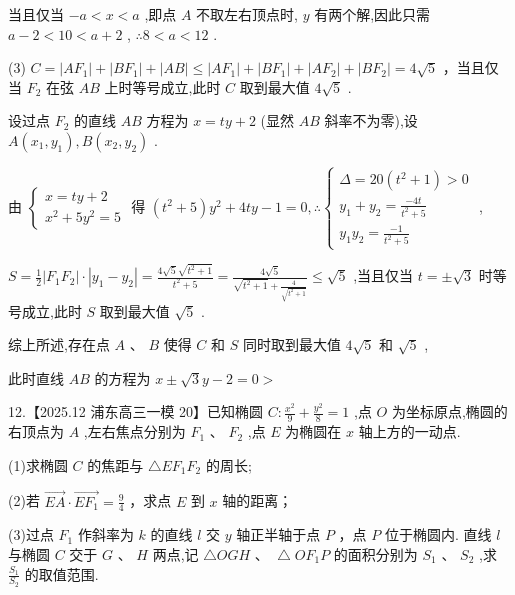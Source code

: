 \documentclass[10pt]{article}
\begin{document}
当且仅当 \(- a < x < a\) ,即点 \(A\) 不取左右顶点时, \(y\) 有两个解,因此只需 \(a - 2 < {10} < a + 2\) , \(\therefore 8 < a < {12}\) .

(3) \(C = \left| {A{F}_{1}}\right|  + \left| {B{F}_{1}}\right|  + \left| {AB}\right|  \leq  \left| {A{F}_{1}}\right|  + \left| {B{F}_{1}}\right|  + \left| {A{F}_{2}}\right|  + \left| {B{F}_{2}}\right|  = 4\sqrt{5}\) ，当且仅当 \({F}_{2}\) 在弦 \({AB}\) 上时等号成立,此时 \(C\) 取到最大值 \(4\sqrt{5}\) .

设过点 \({F}_{2}\) 的直线 \({AB}\) 方程为 \(x = {ty} + 2\) (显然 \({AB}\) 斜率不为零),设 \(A\left( {{x}_{1},{y}_{1}}\right) ,B\left( {{x}_{2},{y}_{2}}\right)\) .

由 \(\left\{  \begin{matrix} x = {ty} + 2 \\  {x}^{2} + 5{y}^{2} = 5 \end{matrix}\right.\) 得 \(\left( {{t}^{2} + 5}\right) {y}^{2} + {4ty} - 1 = 0,\therefore \left\{  \begin{matrix} \Delta  = {20}\left( {{t}^{2} + 1}\right)  > 0 \\  {y}_{1} + {y}_{2} = \frac{-{4t}}{{t}^{2} + 5} \\  {y}_{1}{y}_{2} = \frac{-1}{{t}^{2} + 5} \end{matrix}\right.\) ,

\(S = \frac{1}{2}\left| {{F}_{1}{F}_{2}}\right|  \cdot  \left| {{y}_{1} - {y}_{2}}\right|  = \frac{4\sqrt{5}\sqrt{{t}^{2} + 1}}{{t}^{2} + 5} = \frac{4\sqrt{5}}{\sqrt{{t}^{2} + 1} + \frac{4}{\sqrt{{t}^{2} + 1}}} \leq  \sqrt{5}\) ,当且仅当 \(t =  \pm  \sqrt{3}\) 时等号成立,此时 \(S\) 取到最大值 \(\sqrt{5}\) .

综上所述,存在点 \(A\text{ 、 }B\) 使得 \(C\) 和 \(S\) 同时取到最大值 \(4\sqrt{5}\) 和 \(\sqrt{5}\) ,

此时直线 \({AB}\) 的方程为 \(x \pm  \sqrt{3}y - 2 = 0 >\)

12.【2025.12 浦东高三一模 20】已知椭圆 \(C : \frac{{x}^{2}}{9} + \frac{{y}^{2}}{8} = 1\) ,点 \(O\) 为坐标原点,椭圆的右顶点为 \(A\) ,左右焦点分别为 \({F}_{1}\text{ 、 }{F}_{2}\) ,点 \(E\) 为椭圆在 \(x\) 轴上方的一动点.

(1)求椭圆 \(C\) 的焦距与 \(\bigtriangleup E{F}_{1}{F}_{2}\) 的周长;

(2)若 \(\overrightarrow{EA} \cdot  \overrightarrow{E{F}_{1}} = \frac{9}{4}\) ，求点 \(E\) 到 \(x\) 轴的距离；

(3)过点 \({F}_{1}\) 作斜率为 \(k\) 的直线 \(l\) 交 \(y\) 轴正半轴于点 \(P\) ，点 \(P\) 位于椭圆内. 直线 \(l\) 与椭圆 \(C\) 交于 \(G\text{ 、 }H\) 两点,记 \(\bigtriangleup {OGH}\text{ 、 }\bigtriangleup O{F}_{1}P\) 的面积分别为 \({S}_{1}\text{ 、 }{S}_{2}\) ,求 \(\frac{{S}_{1}}{{S}_{2}}\) 的取值范围.
\end{document}
